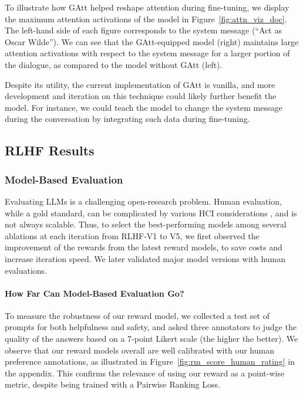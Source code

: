 To illustrate how GAtt helped reshape attention during fine-tuning, we display the maximum attention activations of the model in Figure~\ref{fig:attn_viz_doc}. The left-hand side of each figure corresponds to the system message (``Act as Oscar Wilde''). We can see that the GAtt-equipped model (right) maintains large attention activations with respect to the system message for a larger portion of the dialogue, as compared to the model without GAtt (left).

Despite its utility, the current implementation of GAtt is vanilla, and more development and iteration on this technique could likely further benefit the model. For instance, we could teach the model to change the system message during the conversation by integrating such data during fine-tuning.

\subsection{RLHF Results}
\subsubsection{Model-Based Evaluation}

Evaluating LLMs is a challenging open-research problem. Human evaluation, while a gold standard, can be complicated by various HCI considerations \citep{clark-etal-2021-thats, gehrmann-etal-2023-repairing}, and is not always scalable. Thus, to select the best-performing models among several ablations at each iteration from RLHF-V1 to V5, we first observed the improvement of the rewards from the latest reward models, to save costs and increase iteration speed. We later validated major model versions with human evaluations. 

\paragraph{How Far Can Model-Based Evaluation Go?} To measure the robustness of our reward model, we collected a test set of prompts for both helpfulness and safety, and asked three annotators to judge the quality of the answers based on a 7-point Likert scale (the higher the better). We observe that our reward models overall are well calibrated with our human preference annotations, as illustrated in Figure~\ref{fig:rm_score_human_rating} in the appendix. This confirms the relevance of using our reward as a point-wise metric, despite being trained with a Pairwise Ranking Loss.

